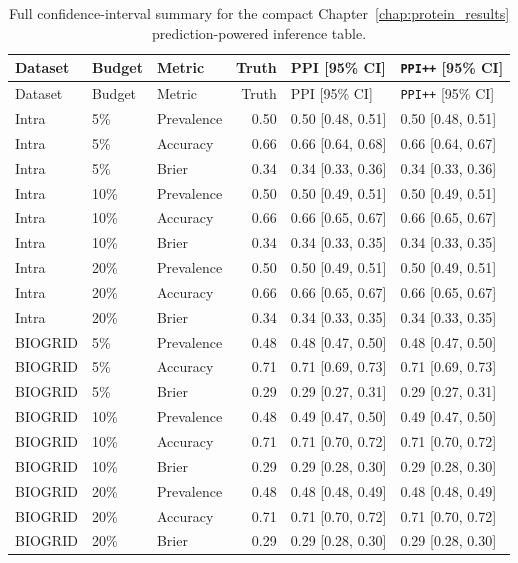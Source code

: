 \begingroup
\setlength{\LTleft}{\fill}
\setlength{\LTright}{\fill}
\small
\begin{longtable}{@{}lllrp{}p{}@{}}
\caption[Appendix summary of core Chapter 5 inference estimates]{Full confidence-interval summary for the compact Chapter~\ref{chap:protein_results} prediction-powered inference table.}\label{tab:app_chap5_ppi_core_full}\\
\toprule
Dataset & Budget & Metric & Truth & PPI [95\% CI] & \texttt{PPI++} [95\% CI] \\
\midrule
\endfirsthead
\toprule
Dataset & Budget & Metric & Truth & PPI [95\% CI] & \texttt{PPI++} [95\% CI] \\
\midrule
\endhead
\bottomrule
\endfoot
Intra & 5\% & Prevalence & 0.50 & 0.50 [0.48, 0.51] & 0.50 [0.48, 0.51] \\
Intra & 5\% & Accuracy & 0.66 & 0.66 [0.64, 0.68] & 0.66 [0.64, 0.67] \\
Intra & 5\% & Brier & 0.34 & 0.34 [0.33, 0.36] & 0.34 [0.33, 0.36] \\
Intra & 10\% & Prevalence & 0.50 & 0.50 [0.49, 0.51] & 0.50 [0.49, 0.51] \\
Intra & 10\% & Accuracy & 0.66 & 0.66 [0.65, 0.67] & 0.66 [0.65, 0.67] \\
Intra & 10\% & Brier & 0.34 & 0.34 [0.33, 0.35] & 0.34 [0.33, 0.35] \\
Intra & 20\% & Prevalence & 0.50 & 0.50 [0.49, 0.51] & 0.50 [0.49, 0.51] \\
Intra & 20\% & Accuracy & 0.66 & 0.66 [0.65, 0.67] & 0.66 [0.65, 0.67] \\
Intra & 20\% & Brier & 0.34 & 0.34 [0.33, 0.35] & 0.34 [0.33, 0.35] \\
BIOGRID & 5\% & Prevalence & 0.48 & 0.48 [0.47, 0.50] & 0.48 [0.47, 0.50] \\
BIOGRID & 5\% & Accuracy & 0.71 & 0.71 [0.69, 0.73] & 0.71 [0.69, 0.73] \\
BIOGRID & 5\% & Brier & 0.29 & 0.29 [0.27, 0.31] & 0.29 [0.27, 0.31] \\
BIOGRID & 10\% & Prevalence & 0.48 & 0.49 [0.47, 0.50] & 0.49 [0.47, 0.50] \\
BIOGRID & 10\% & Accuracy & 0.71 & 0.71 [0.70, 0.72] & 0.71 [0.70, 0.72] \\
BIOGRID & 10\% & Brier & 0.29 & 0.29 [0.28, 0.30] & 0.29 [0.28, 0.30] \\
BIOGRID & 20\% & Prevalence & 0.48 & 0.48 [0.48, 0.49] & 0.48 [0.48, 0.49] \\
BIOGRID & 20\% & Accuracy & 0.71 & 0.71 [0.70, 0.72] & 0.71 [0.70, 0.72] \\
BIOGRID & 20\% & Brier & 0.29 & 0.29 [0.28, 0.30] & 0.29 [0.28, 0.30] \\
\end{longtable}
\endgroup
